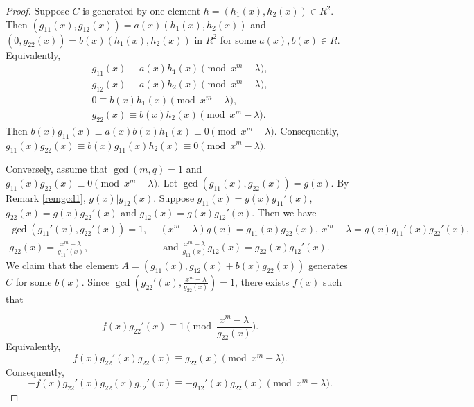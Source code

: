 \documentclass[10pt,a4paper]{amsart}
\begin{document}
 \begin{proof}
     Suppose $C$ is generated by one element $h=(h_1(x),h_2(x))\in R^2$. Then
     $(g_{11}(x),g_{12}(x))=a(x)(h_1(x),h_2(x))$ and $(0,g_{22}(x))=b(x)(h_1(x),h_2(x))$ in $R^2$ for some $a(x),b(x)\in R$.
     Equivalently,
     \begin{equation*}
         \begin{split}
             g_{11}(x)\equiv a(x)h_1(x) \pmod{x^m-\lambda},\\
             g_{12}(x)\equiv a(x)h_2(x) \pmod{x^m-\lambda},\\
             0\equiv b(x)h_1(x)\pmod{x^m-\lambda},\\
             g_{22}(x)\equiv b(x)h_2(x) \pmod{x^m-\lambda}.
         \end{split}
     \end{equation*}
 Then $b(x)g_{11}(x)\equiv a(x)b(x)h_1(x)\equiv 0 \pmod{x^m-\lambda}$.  Consequently, $g_{11}(x)g_{22}(x)\equiv b(x)g_{11}(x)h_2(x)\equiv 0 \pmod{x^m-\lambda}$.

 Conversely, assume that $\gcd(m,q)=1$ and $g_{11}(x)g_{22}(x)\equiv 0 \pmod{x^m-\lambda}$. Let $\gcd(g_{11}(x),g_{22}(x))=g(x)$. By Remark \ref{remgcd1}, $g(x)|g_{12}(x)$. Suppose $g_{11}(x)=g(x)g_{11}'(x)$, $g_{22}(x)=g(x)g_{22}'(x)$ and $g_{12}(x)=g(x)g_{12}'(x)$. Then we have
 \begin{equation*}
     \begin{split}
      \gcd(g_{11}'(x),g_{22}'(x))=1, \ \ & (x^m-\lambda)g(x)=g_{11}(x)g_{22}(x),\   x^m-\lambda=g(x)g_{11}'(x)g_{22}'(x), \\
      g_{22}(x)=\frac{x^m-\lambda}{g_{11}'(x)}, & \text{ and }\frac{x^m-\lambda}{g_{11}(x)}g_{12}(x)=g_{22}(x)g_{12}'(x).
     \end{split}
 \end{equation*}
 We claim that the element $A=( g_{11}(x), g_{12}(x)+b(x)g_{22}(x))$ generates $C$ for some $b(x)$. 
 Since $\gcd(g_{22}'(x),\frac{x^m-\lambda}{g_{22}(x)})=1$, there exists $f(x)$ such that 

         $$f(x)g_{22}'(x)\equiv 1  \pmod{\frac{x^m-\lambda}{g_{22}(x)}}.$$
   Equivalently, $$f(x)g_{22}'(x)g_{22}(x)\equiv g_{22}(x) \pmod{x^m-\lambda}.$$
         Consequently,  
      $$-f(x)g_{22}'(x)g_{22}(x)g_{12}'(x)\equiv -g_{12}'(x)g_{22}(x) \pmod{x^m-\lambda}.$$
     

\end{proof}
\end{document}

